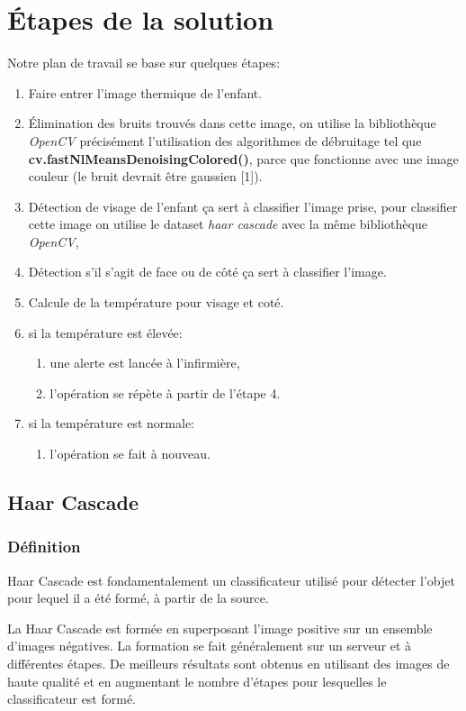 \documentclass[12pt]{article}
\begin{document}
\section{\' Etapes de la solution}
Notre plan de travail se base sur quelques étapes:
\begin{enumerate}
	\item Faire entrer l’image thermique de l’enfant.
	\item \' Elimination des bruits trouvés dans cette image,  on utilise la bibliothèque \textit{OpenCV} précisément l'utilisation des algorithmes de débruitage tel que \\
	 \textbf{cv.fastNlMeansDenoisingColored()}, parce que fonctionne avec une image couleur (le bruit devrait être gaussien [1]).
	\item Détection de visage de l’enfant ça sert à classifier l’image prise, pour classifier cette image on utilise le dataset \textit{haar cascade} avec la même bibliothèque \textit{OpenCV},
	\item Détection s’il s’agit  de face ou de côté ça sert à classifier l’image.
	\item Calcule de la température pour visage et coté. 
	\item si la température est élevée:
	\begin{enumerate}
		\item une alerte est lancée à l’infirmière,
		\item l’opération se répète à partir de  l’étape 4.
	\end{enumerate}
	\item si la température est normale:
	\begin{enumerate}
		\item l’opération se fait à nouveau.
	\end{enumerate}
\end{enumerate}

\subsection*{Haar Cascade}
\subsubsection*{Définition}
Haar Cascade est fondamentalement un classificateur utilisé pour détecter l'objet pour lequel il a été formé, à partir de la source.

La Haar Cascade est formée en superposant l'image positive sur un ensemble d'images négatives. La formation se fait généralement sur un serveur et à différentes étapes. De meilleurs résultats sont obtenus en utilisant des images de haute qualité et en augmentant le nombre d'étapes pour lesquelles le classificateur est formé.
\end{document}
